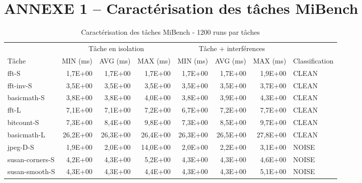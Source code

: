 \cleardoublepage


\section*{ANNEXE 1 -- Caractérisation des tâches MiBench} \label{Annexe1}
\setcounter{chapter}{0}
\setcounter{table}{0}
\renewcommand{\thetable}{A\arabic{table}}
 \begin{table}[ht!]
	\centering
	\caption{Caractérisation des tâches MiBench - 1200 runs par tâches} 	\label{tab:Phase1-2-results}
	\begin{adjustwidth}{-40pt}{0pt}  
		\begin{tabular}{@{}lrrrrrrl@{}}
			\toprule
			         & \multicolumn{3}{c}{Tâche en isolation}  & \multicolumn{3}{c}{Tâche + interférences} &  \\ 
			\cmidrule(lr){2-4} \cmidrule(lr){5-7}
			Tâche	 & MIN (ms)  & AVG (ms)  & MAX (ms)  & MIN (ms)  & AVG (ms)  & MAX (ms)  & Classification     \\ 
			\midrule
			fft-S               & 1,7E+00   & 1,7E+00   & 1,7E+00   & 1,7E+00   & 1,7E+00   & 1,9E+00   & CLEAN    \\
			fft-inv-S           & 3,5E+00   & 3,5E+00   & 3,5E+00   & 3,5E+00   & 3,5E+00   & 3,7E+00   & CLEAN    \\
			basicmath-S         & 3,8E+00   & 3,8E+00   & 4,0E+00   & 3,8E+00   & 3,9E+00   & 4,3E+00   & CLEAN    \\
			fft-L               & 7,1E+00   & 7,1E+00   & 7,2E+00   & 6,7E+00   & 7,2E+00   & 7,7E+00   & CLEAN    \\
			bitcount-S          & 7,3E+00   & 8,4E+00   & 9,8E+00   & 7,3E+00   & 8,5E+00   & 9,7E+00   & CLEAN    \\
			basicmath-L         & 26,2E+00  & 26,3E+00  & 26,4E+00  & 26,3E+00  & 26,5E+00  & 27,8E+00  & CLEAN    \\
			jpeg-D-S            & 1,9E+00   & 2,0E+00   & 14,0E+00  & 2,0E+00   & 2,2E+00   & 3,1E+00   & NOISE    \\
			susan-corners-S     & 4,2E+00   & 4,3E+00   & 5,2E+00   & 4,3E+00   & 4,3E+00   & 4,6E+00   & NOISE    \\
			susan-smooth-S      & 4,3E+00   & 4,3E+00   & 4,4E+00   & 4,3E+00   & 4,3E+00   & 5,1E+00   & NOISE    \\

\end{tabular}
\end{adjustwidth}
\end{table}
